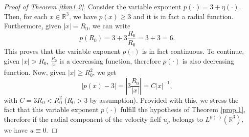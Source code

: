 \documentclass[a4paper,12pt]{amsart}
\theoremstyle{definition}
\theoremstyle{plain}
\def\R{\mathbb{R}}
\def\R{\mathbb R}
\begin{document}
\begin{proof}[Proof of Theorem \ref{thm1.2}]
Consider the variable exponent $p(\cdot)= 3 + \eta(\cdot)$. 
Then, for each $x\in \R^3$, we have $p(x)\geq 3$ and it is in fact a radial function. Furthermore,  given $|x|=R_0$, we can write 
    \[
p(R_0)=     3 +3 \frac{R_0}{R_0} = 3+ 3 = 6.
    \]
This proves that the variable exponent  $p(\cdot)$ is in fact  continuous.
To continue,  given $ |x| > R_0 $,  $ \frac{R_0}{|x|} $ is  a decreasing function, therefore $ p(\cdot) $ is also  decreasing function. Now, given  $ |x| \geq R_0^2 $, we get  
\[
\left| p(x) -  3 \right| =
 \left| 3 \frac{R_0}{|x|} \right| = C |x|^{-1},
\]
with $ C =  3 R_0 <R_0^2$ ($R_0>3$ by assumption). Provided with this, we stress the fact that this variable exponent $p(\cdot)$ fulfill the hypothesis of Theorem \ref{prop.1}, therefore if the radial  component of the velocity fielf $u_\rho$ belongs to $L^{p(\cdot)} (\R^3)$, we have $u\equiv 0$.
\end{proof}


 
 
\end{document}
